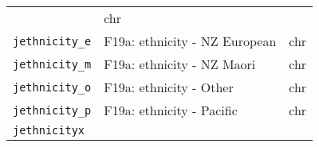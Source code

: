 \documentclass[]{article}
\begin{document}
\begin{longtable}[]{@{}lll@{}}
\begin{minipage}[t]{0.70\columnwidth}
\end{minipage} & \begin{minipage}[t]{0.08\columnwidth}\raggedright\strut
chr\strut
\end{minipage}\tabularnewline
\begin{minipage}[t]{0.14\columnwidth}\raggedright\strut
\texttt{jethnicity\_e}\strut
\end{minipage} & \begin{minipage}[t]{0.70\columnwidth}\raggedright\strut
F19a: ethnicity - NZ European\strut
\end{minipage} & \begin{minipage}[t]{0.08\columnwidth}\raggedright\strut
chr\strut
\end{minipage}\tabularnewline
\begin{minipage}[t]{0.14\columnwidth}\raggedright\strut
\texttt{jethnicity\_m}\strut
\end{minipage} & \begin{minipage}[t]{0.70\columnwidth}\raggedright\strut
F19a: ethnicity - NZ Maori\strut
\end{minipage} & \begin{minipage}[t]{0.08\columnwidth}\raggedright\strut
chr\strut
\end{minipage}\tabularnewline
\begin{minipage}[t]{0.14\columnwidth}\raggedright\strut
\texttt{jethnicity\_o}\strut
\end{minipage} & \begin{minipage}[t]{0.70\columnwidth}\raggedright\strut
F19a: ethnicity - Other\strut
\end{minipage} & \begin{minipage}[t]{0.08\columnwidth}\raggedright\strut
chr\strut
\end{minipage}\tabularnewline
\begin{minipage}[t]{0.14\columnwidth}\raggedright\strut
\texttt{jethnicity\_p}\strut
\end{minipage} & \begin{minipage}[t]{0.70\columnwidth}\raggedright\strut
F19a: ethnicity - Pacific\strut
\end{minipage} & \begin{minipage}[t]{0.08\columnwidth}\raggedright\strut
chr\strut
\end{minipage}\tabularnewline
\begin{minipage}[t]{0.14\columnwidth}\raggedright\strut
\texttt{jethnicityx}\strut
\end{minipage} & \begin{minipage}[t]{0.70\columnwidth}\raggedright\strut

\end{minipage}
\end{longtable}
\end{document}
